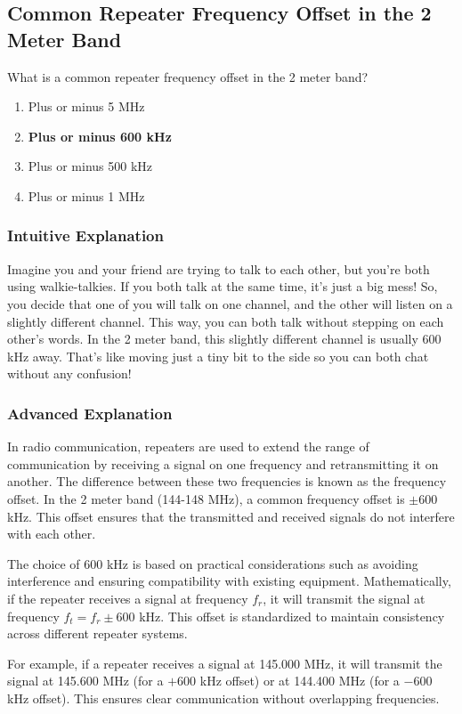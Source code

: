 \subsection{Common Repeater Frequency Offset in the 2 Meter Band}
\label{T2A01}

\begin{tcolorbox}[colback=gray!10!white,colframe=black!75!black,title=T2A01]
What is a common repeater frequency offset in the 2 meter band?
\begin{enumerate}[label=\Alph*]
    \item Plus or minus 5 MHz
    \item \textbf{Plus or minus 600 kHz}
    \item Plus or minus 500 kHz
    \item Plus or minus 1 MHz
\end{enumerate}
\end{tcolorbox}

\subsubsection{Intuitive Explanation}
Imagine you and your friend are trying to talk to each other, but you’re both using walkie-talkies. If you both talk at the same time, it’s just a big mess! So, you decide that one of you will talk on one channel, and the other will listen on a slightly different channel. This way, you can both talk without stepping on each other’s words. In the 2 meter band, this slightly different channel is usually 600 kHz away. That’s like moving just a tiny bit to the side so you can both chat without any confusion!

\subsubsection{Advanced Explanation}
In radio communication, repeaters are used to extend the range of communication by receiving a signal on one frequency and retransmitting it on another. The difference between these two frequencies is known as the frequency offset. In the 2 meter band (144-148 MHz), a common frequency offset is $\pm 600$ kHz. This offset ensures that the transmitted and received signals do not interfere with each other.

The choice of 600 kHz is based on practical considerations such as avoiding interference and ensuring compatibility with existing equipment. Mathematically, if the repeater receives a signal at frequency $f_r$, it will transmit the signal at frequency $f_t = f_r \pm 600$ kHz. This offset is standardized to maintain consistency across different repeater systems.

For example, if a repeater receives a signal at 145.000 MHz, it will transmit the signal at 145.600 MHz (for a $+600$ kHz offset) or at 144.400 MHz (for a $-600$ kHz offset). This ensures clear communication without overlapping frequencies.

